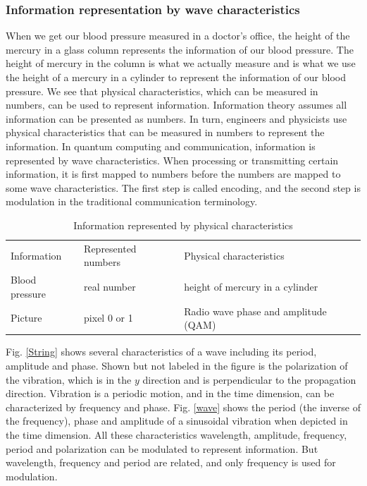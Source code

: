 



\subsubsection{Information representation by wave characteristics}
When we get our blood pressure measured in a doctor's office, the height of the mercury in a glass column represents the information of our blood pressure. The height of mercury in the column is what we actually measure and is what we use the height of a mercury in a cylinder to represent the information of our blood pressure. We see that physical characteristics, which can be measured in numbers, can be used to represent information. Information theory assumes all information can be presented as numbers. In turn, engineers and physicists use physical characteristics that can be measured in numbers to represent the information. In quantum computing and communication, information is represented by wave characteristics. When processing or transmitting certain information, it is first mapped to numbers before the numbers are mapped to some wave characteristics. The first step is called encoding, and the second step is modulation in the traditional communication terminology.
\begin{table}[]
\caption{Information represented by physical characteristics}
\label{information-characteristics}
\begin{tabular}{lll}
Information &Represented numbers & Physical characteristics  \\
Blood pressure & real number & height of mercury in a cylinder \\
Picture & pixel 0 or 1 & Radio wave phase and amplitude (QAM)
\end{tabular}
\end{table}

Fig. \ref{String} shows several characteristics of a wave including its period, amplitude and phase. Shown but not labeled in the figure is the polarization of the vibration, which is in the $y$ direction and is perpendicular to the propagation direction. Vibration is a periodic motion, and in the time dimension, can be characterized by frequency and phase. Fig. \ref{wave} shows the period (the inverse of the frequency), phase and amplitude of a sinusoidal vibration when depicted in the time dimension. All these characteristics wavelength, amplitude, frequency, period and polarization can be modulated to represent information. But wavelength, frequency and period are related, and only frequency is used for modulation.

